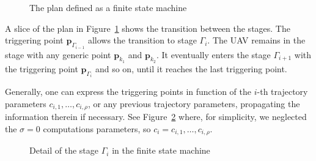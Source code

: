 \documentclass[letterpaper,10pt,conference]{ieeeconf}
\theoremstyle{definition}
\begin{document}
\begin{figure}[h]
  \center
  \caption{The plan defined as a finite state machine}
  \label{fig:state-machine}
\end{figure}

A slice of the plan in Figure~\ref{fig:state-machine} shows the transition between the stages. The triggering point $\mathbf{p}_{\Gamma_{i-1}}$ allows the transition to stage $\Gamma_i$. The UAV remains in the stage with any generic point $\mathbf{p}_{k_1}$ and $\mathbf{p}_{k_2}$. It eventually enters the stage $\Gamma_{i+1}$ with the triggering point $\mathbf{p}_{\Gamma_i}$ and so on, until it reaches the last triggering point.

Generally, one can express the triggering points in function of the $i$-th trajectory parameters $c_{i,1},\dots,c_{i,\rho}$, or any previous trajectory parameters, propagating the information therein if necessary. See Figure~\ref{fig:state-machine2} where, for simplicity, we neglected the $\sigma=0$ computations parameters, so $c_i=c_{i,1},\dots,c_{i,\rho}$.

\begin{figure}[h]
  \center
  \caption{Detail of the stage $\Gamma_i$ in the finite state machine}
  \label{fig:state-machine2}
\end{figure}
\end{document}
